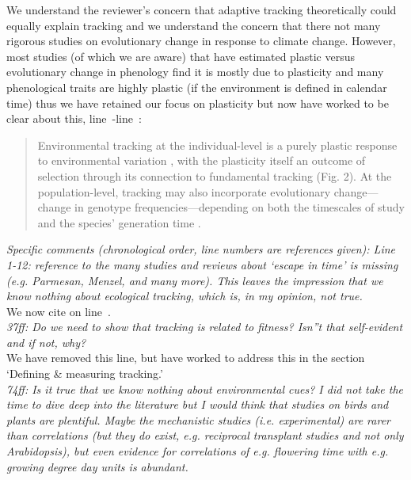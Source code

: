 \documentclass[11pt,letterpaper]{article}
\newcommand{\lr}[1]{line~\lineref{#1}}
\begin{document}
We understand the reviewer's concern that adaptive tracking \citep[\emph{sensu}][]{simons2011} theoretically could equally explain tracking and we understand the concern that there not many rigorous studies on evolutionary change in response to climate change. However, most studies (of which we are aware) that have estimated plastic versus evolutionary change in phenology find it is mostly due to plasticity and many phenological traits are highly plastic (if the environment is defined in calendar time) thus we have retained our focus on plasticity but now have worked to be clear about this, \lr{Bminusbstart}-\lr{moretrackE}:
\begin{quote}
Environmental tracking at the individual-level is a purely plastic response to environmental variation \citep[in line with current findings on most climate change responses,][]{bonamour2019}, with the plasticity itself an outcome of selection \citep{chevin2010} through its connection to fundamental tracking (Fig. 2). At the population-level, tracking may also incorporate evolutionary change---change in genotype frequencies---depending on both the timescales of study and the species' generation time \citep[this evolutionary response can be predicted as the difference between the environmental sensitivity of phenotypic selection and an organism's plasticity, $|B-b|$ in][]{chevin2010}.
\end{quote}

\emph{Specific comments (chronological order, line numbers are references given):
Line 1-12: reference to the many studies and reviews about `escape in time' is missing (e.g.
Parmesan, Menzel, and many more). This leaves the impression that we know nothing about
ecological tracking, which is, in my opinion, not true.}\\

We now cite \citet{Menzel:2006xn,Parmesan:2006cr} on \lr{r1ass}.\\

\emph{37ff: Do we need to show that tracking is related to fitness? Isn''t that self-evident and if
not, why?}\\

We have removed this line, but have worked to address this in the section `Defining \& measuring tracking.'\\

\emph{74ff: Is it true that we know nothing about environmental cues? I did not take the time to
dive deep into the literature but I would think that studies on birds and plants are
plentiful. Maybe the mechanistic studies (i.e. experimental) are rarer than correlations (but
they do exist, e.g. reciprocal transplant studies and not only Arabidopsis), but even
evidence for correlations of e.g. flowering time with e.g. growing degree day units is
abundant.}\\
\end{document}
